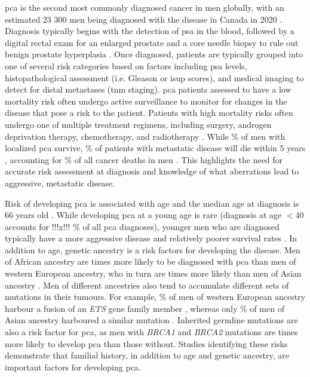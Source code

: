 \Gls{pca} is the second most commonly diagnosed cancer in men globally, with an estimated 23 300 men being diagnosed with the disease in Canada in 2020 \cite{brayGlobalCancerStatistics2018,brennerProjectedEstimatesCancer2020}.
Diagnosis typically begins with the detection of \gls{psa} in the blood, followed by a digital rectal exam for an enlarged prostate and a core needle biopsy to rule out benign prostate hyperplasia \cite{rebelloProstateCancer2021}.
Once diagnosed, patients are typically grouped into one of several risk categories based on factors including \gls{psa} levels, histopathological assessment (i.e. Gleason or \gls{isup} scores), and medical imaging to detect for distal metastases (\gls{tnm} staging)\cite{rebelloProstateCancer2021}.
\Gls{pca} patients assessed to have a low mortality risk often undergo active surveillance to monitor for changes in the disease that pose a risk to the patient.
Patients with high mortality risks often undergo one of multiple treatment regimens, including surgery, androgen deprivation therapy, chemotherapy, and radiotherapy \cite{rebelloProstateCancer2021}.
While  \% of men with localized \gls{pca} survive,  \% of patients with metastatic disease will die within 5 years \cite{hahnMetastaticCastrationSensitiveProstate2018,SEERProstateCancer}, accounting for  \% of all cancer deaths in men \cite{brennerProjectedEstimatesCancer2020}.
This highlights the need for accurate risk assessment at diagnosis and knowledge of what aberrations lead to aggressive, metastatic disease.

Risk of developing \gls{pca} is associated with age and the median age at diagnosis is 66 years old \cite{rawlaEpidemiologyProstateCancer2019}.
While developing \gls{pca} at a young age is rare (diagnosis at age $< 40$ accounts for !!!x!!! \% of all \gls{pca} diagnoses), younger men who are diagnosed typically have a more aggressive disease and relatively poorer survival rates \cite{SEERProstateCancer}.
In addition to age, genetic ancestry is a risk factors for developing the disease.
Men of African ancestry are  times more likely to be diagnosed with \gls{pca} than men of western European ancestry, who in turn are  times more likely than men of Asian ancestry \cite{SEERProstateCancer,smithAfricanAmericanProstateCancer2017,dalleraChangingIncidenceMetastatic2019}.
Men of different ancestries also tend to accumulate different sets of mutations in their tumours.
For example,  \% of men of western European ancestry harbour a fusion of an \emph{ETS} gene family member \cite{fraserGenomicHallmarksLocalized2017}, whereas only  \% of men of Asian ancestry harboured a similar mutation \cite{liGenomicEpigenomicAtlas2020}.
Inherited germline mutations are also a risk factor for \gls{pca}, as men with \emph{BRCA1} and \emph{BRCA2} mutations are  times more likely to develop \gls{pca} than those without.
Studies identifying these risks demonstrate that familial history, in addition to age and genetic ancestry, are important factors for developing \gls{pca}.

